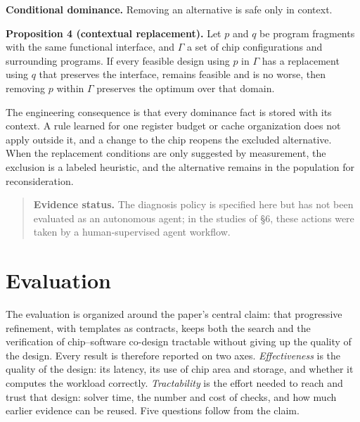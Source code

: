 \documentclass[11pt]{article}
\begin{document}
\textbf{Conditional dominance.} Removing an alternative is safe only in context.

\textbf{Proposition 4 (contextual replacement).} Let \(p\) and \(q\) be program fragments with the same functional interface, and \(\Gamma\) a set of chip configurations and surrounding programs. If every feasible design using \(p\) in \(\Gamma\) has a replacement using \(q\) that preserves the interface, remains feasible and is no worse, then removing \(p\) within \(\Gamma\) preserves the optimum over that domain.

The engineering consequence is that every dominance fact is stored with its context. A rule learned for one register budget or cache organization does not apply outside it, and a change to the chip reopens the excluded alternative. When the replacement conditions are only suggested by measurement, the exclusion is a labeled heuristic, and the alternative remains in the population for reconsideration.

\begin{quote}
\textbf{Evidence status.} The diagnosis policy is specified here but has not been evaluated as an autonomous agent; in the studies of §6, these actions were taken by a human-supervised agent workflow.
\end{quote}

\hypertarget{evaluation}{%
\section{Evaluation}\label{evaluation}}

The evaluation is organized around the paper's central claim: that progressive refinement, with templates as contracts, keeps both the search and the verification of chip--software co-design tractable without giving up the quality of the design. Every result is therefore reported on two axes. \emph{Effectiveness} is the quality of the design: its latency, its use of chip area and storage, and whether it computes the workload correctly. \emph{Tractability} is the effort needed to reach and trust that design: solver time, the number and cost of checks, and how much earlier evidence can be reused. Five questions follow from the claim.
\end{document}
